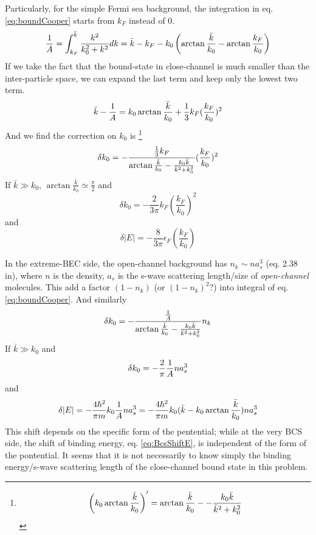 Particularly, for the simple Fermi sea background, the integration in eq. \eqref{eq:boundCooper} starts from $k_F$ instead of 0.  
\[
\frac{1}{A}=\int^{\bar{k}}_{k_F}\frac{k^2}{k_0^2+k^2}dk=\bar{k}-k_F-k_0\left(\arctan\frac{\bar{k}}{k_0}-\arctan\frac{k_F}{k_0}\right)
\]
If we take the fact that the bound-state in close-channel is much smaller than the inter-particle space, we can expand the last term and keep only the lowest two term. 
\begin{equation}
\bar{k}-\frac{1}{A}=k_0\arctan\frac{\bar{k}}{k_0}+\frac{1}{3}k_F(\frac{k_F}{k_0})^2
\end{equation}
And we find the correction on $k_0$ is
\footnote{
\[
\left(k_0\arctan\frac{\bar{k}}{k_0}\right)'=\arctan\frac{\bar{k}}{k_0}--\frac{k_0\bar{k}}{\bar{k}^2+k_0^2}
\]
}
\begin{equation}
\delta{}k_0=-\frac{\frac{1}{3}k_F}{\arctan\frac{\bar{k}}{k_0}-\frac{k_0\bar{k}}{\bar{k}^2+k_0^2}}(\frac{k_F}{k_0})^2
\end{equation}
If $\bar{k}\gg{}k_0$, $\arctan\frac{\bar{k}}{k_0}\simeq\frac{\pi}2$ and 
\begin{equation}
\delta{}k_0=-\frac{2}{3\pi}{k_F}(\frac{k_F}{k_0})^2
\end{equation}
and 
\begin{equation}\label{eq:BcsShiftE}
\delta{|E|}=-\frac{8}{3\pi}{\epsilon_F}(\frac{k_F}{k_0})
\end{equation}


In the extreme-BEC side, the open-channel background has $n_k\sim{}na_s^3$ (eq. 2.38 in\cite{ZhangThesis}), where $n$ is the density, $a_s$ is the s-wave scattering length/size of \emph{open-channel} molecules.  This add a factor $(1-n_k)$ (or $(1-n_k)^2$?)  into integral of eq. \eqref{eq:boundCooper}.  And similarly
\begin{equation}
\delta{}k_0=-\frac{\frac{1}{A}}{\arctan\frac{\bar{k}}{k_0}-\frac{k_0\bar{k}}{\bar{k}^2+k_0^2}}n_k
\end{equation}
If $\bar{k}\gg{}k_0$ and 
\begin{equation}
\delta{}k_0=-\frac{2}{\pi}\frac{1}{A}na_s^3
\end{equation}
and 
\begin{equation}\label{eq:BecShiftE}
\delta{|E|}=-\frac{4\hbar^2}{\pi{}m}k_0\frac{1}{A}na_s^3=-\frac{4\hbar^2}{\pi{}m}k_0(\bar{k}-k_0\arctan\frac{\bar{k}}{k_0})na_s^3
\end{equation}
This shift depends on the specific form of the pentential; while at the very BCS side, the shift of binding energy, eq. \eqref{eq:BcsShiftE}, is independent of the form of the pontential. It seems that it is not necessarily to know simply the binding energy/s-wave scattering length of the close-channel bound state in this problem.  

